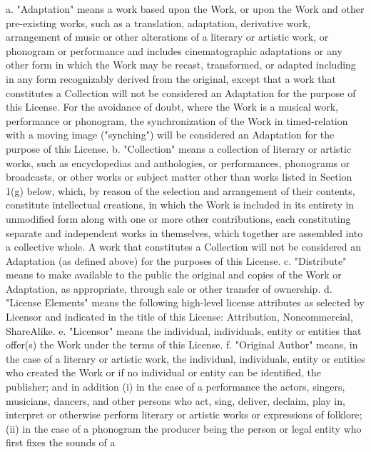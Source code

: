  a. "Adaptation" means a work based upon the Work, or upon the Work and
    other pre-existing works, such as a translation, adaptation,
    derivative work, arrangement of music or other alterations of a
    literary or artistic work, or phonogram or performance and includes
    cinematographic adaptations or any other form in which the Work may be
    recast, transformed, or adapted including in any form recognizably
    derived from the original, except that a work that constitutes a
    Collection will not be considered an Adaptation for the purpose of
    this License. For the avoidance of doubt, where the Work is a musical
    work, performance or phonogram, the synchronization of the Work in
    timed-relation with a moving image ("synching") will be considered an
    Adaptation for the purpose of this License.
 b. "Collection" means a collection of literary or artistic works, such as
    encyclopedias and anthologies, or performances, phonograms or
    broadcasts, or other works or subject matter other than works listed
    in Section 1(g) below, which, by reason of the selection and
    arrangement of their contents, constitute intellectual creations, in
    which the Work is included in its entirety in unmodified form along
    with one or more other contributions, each constituting separate and
    independent works in themselves, which together are assembled into a
    collective whole. A work that constitutes a Collection will not be
    considered an Adaptation (as defined above) for the purposes of this
    License.
 c. "Distribute" means to make available to the public the original and
    copies of the Work or Adaptation, as appropriate, through sale or
    other transfer of ownership.
 d. "License Elements" means the following high-level license attributes
    as selected by Licensor and indicated in the title of this License:
    Attribution, Noncommercial, ShareAlike.
 e. "Licensor" means the individual, individuals, entity or entities that
    offer(s) the Work under the terms of this License.
 f. "Original Author" means, in the case of a literary or artistic work,
    the individual, individuals, entity or entities who created the Work
    or if no individual or entity can be identified, the publisher; and in
    addition (i) in the case of a performance the actors, singers,
    musicians, dancers, and other persons who act, sing, deliver, declaim,
    play in, interpret or otherwise perform literary or artistic works or
    expressions of folklore; (ii) in the case of a phonogram the producer
    being the person or legal entity who first fixes the sounds of a
